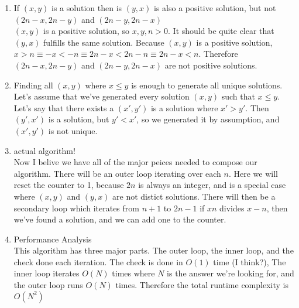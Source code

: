 \documentclass[11pt, oneside]{article}   	%
\begin{document}
\begin{enumerate}
  \item If $(x,y)$ is a solution then is $(y,x)$ is also a positive solution, but not $(2n-x, 2n-y)$ and $(2n-y,2n-x)$\\
    $(x,y)$ is a positive solution, so $x, y, n > 0$. It should be quite clear that $(y,x)$ fulfills the same solution.
    Because $(x,y)$ is a positive solution, $x > n \equiv -x < -n \equiv 2n-x < 2n - n \equiv 2n-x < n$. Therefore $(2n-x,2n-y)$ and $(2n-y,2n-x)$ are not positive
    solutions.

  \item Finding all $(x, y)$ where $x \le y$ is enough to generate all unique solutions.\\
    Let's assume that we've generated every solution $(x,y)$ such that $x \le y$. Let's say that there exists a $(x',y')$ is a solution where $x' > y'$. 
    Then $(y',x')$ is a solution, but $y'< x'$, so we generated it by assumption, and $(x',y')$ is not unique.


  \item actual algorithm!\\
    Now I belive we have all of the major peices needed to compose our algorithm.
    There will be an outer loop iterating over each $n$. 
    Here we will reset the counter to 1, because $2n$ is always an integer, and is a special case where $(x,y)$ and $(y,x)$ are not distict solutions.
    There will then be a secondary loop which iterates from $n+1$ to $2n-1$ if $xn$ divides $x-n$, then we've found a solution, 
    and we can add one to the counter.


  \item Performance Analysis\\
    This algorithm has three major parts. The outer loop, the inner loop, and the check done each iteration. The check is done in $O(1)$ time (I think?),
    The inner loop iterates $O(N)$ times where $N$ is the answer we're looking for, and the outer loop runs $O(N)$ times. Therefore the total runtime complexity is $O(N^2)$

\end{enumerate}
\end{document}
